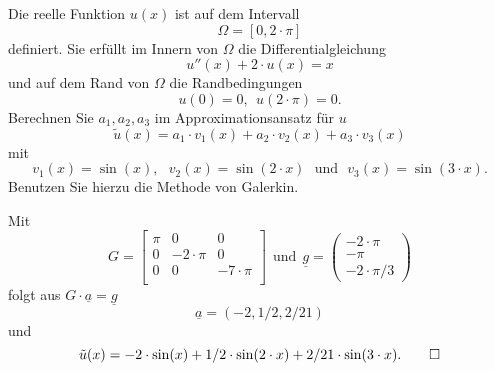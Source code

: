 Die reelle Funktion $u(x)$ ist auf dem Intervall
\[
\Omega = [0, 2 \cdot \pi]
\]
definiert.
Sie erfüllt im Innern von $\Omega$ die Differentialgleichung
\[
u''(x) + 2 \cdot u(x) = x
\]
und auf dem Rand von $\Omega$ die Randbedingungen
\[
u(0) = 0, \ \ u(2 \cdot \pi) = 0.
\]
Berechnen Sie $a_1, a_2, a_3$ im Approximationsansatz für $u$
\[
\tilde u(x) = a_1 \cdot v_1(x) + a_2 \cdot v_2(x) + a_3 \cdot v_3(x)
\]
mit
\[
v_1(x) = \sin(x), \ \ \ v_2(x) = \sin(2 \cdot x) \ \ \ \text{und} \ \ \  v_3(x) = \sin(3 \cdot x).
\]
Benutzen Sie hierzu die Methode von Galerkin.

\begin{loesung}
Mit
\[
G = \left[\begin{array}{ccc} 
\pi & 0 & 0 \\
0 & - 2 \cdot \pi & 0 \\
0 & 0 & -7 \cdot \pi \\
 \end{array}\right] \ \ \text{und} \ \
\underline{g}
=
\left(\begin{array}{c} -2 \cdot \pi \\ - \pi \\ - 2 \cdot \pi/3  \end{array}\right)
\]
folgt aus $G \cdot \underline{a} = \underline{g}$
\[
\underline{a} = (-2, 1/2, 2/21)
\]
und
\[
\tilde u(x) = -2 \cdot \sin(x) + 1/2 \cdot \sin(2 \cdot x) + 2/21 \cdot \sin(3 \cdot x).
\qedhere
\]
\end{loesung}
